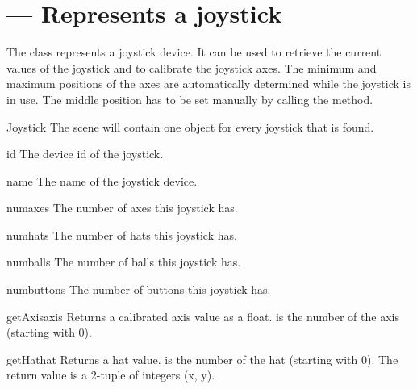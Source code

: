 
\section{ --- Represents a joystick\label{joystick}}

The  class represents a joystick device. It can be used
to retrieve the current values of the joystick and to calibrate the
joystick axes. The minimum and maximum positions of the axes are
automatically determined while the joystick is in use. The middle
position has to be set manually by calling the 
method.

\begin{classdesc*}{Joystick}
The scene will contain one  object for every joystick
that is found. 
\end{classdesc*}

\begin{memberdesc}{id}
The device id of the joystick.
\end{memberdesc}

\begin{memberdesc}{name}
The name of the joystick device.
\end{memberdesc}

\begin{memberdesc}{numaxes}
The number of axes this joystick has.
\end{memberdesc}

\begin{memberdesc}{numhats}
The number of hats this joystick has.
\end{memberdesc}

\begin{memberdesc}{numballs}
The number of balls this joystick has.
\end{memberdesc}

\begin{memberdesc}{numbuttons}
The number of buttons this joystick has.
\end{memberdesc}


\begin{methoddesc}{getAxis}{axis}
Returns a calibrated axis value as a float.  is the number
of the axis (starting with 0).
\end{methoddesc}

\begin{methoddesc}{getHat}{hat}
Returns a hat value.  is the number of the hat (starting with 0).
The return value is a 2-tuple of integers (x, y).
\end{methoddesc}

